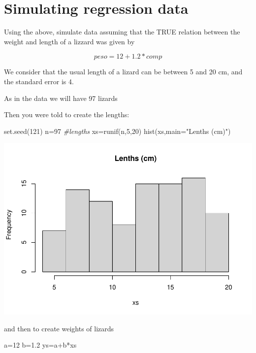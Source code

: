 \documentclass[
]{book}
\newenvironment{Shaded}{\begin{snugshade}}{\end{snugshade}}
\newcommand{\AttributeTok}[1]{\textcolor[rgb]{0.77,0.63,0.00}{#1}}
\newcommand{\CommentTok}[1]{\textcolor[rgb]{0.56,0.35,0.01}{\textit{#1}}}
\newcommand{\DecValTok}[1]{\textcolor[rgb]{0.00,0.00,0.81}{#1}}
\newcommand{\FloatTok}[1]{\textcolor[rgb]{0.00,0.00,0.81}{#1}}
\newcommand{\FunctionTok}[1]{\textcolor[rgb]{0.00,0.00,0.00}{#1}}
\newcommand{\NormalTok}[1]{#1}
\newcommand{\OtherTok}[1]{\textcolor[rgb]{0.56,0.35,0.01}{#1}}
\newcommand{\SpecialCharTok}[1]{\textcolor[rgb]{0.00,0.00,0.00}{#1}}
\newcommand{\StringTok}[1]{\textcolor[rgb]{0.31,0.60,0.02}{#1}}
\begin{document}
\hypertarget{simulating-regression-data}{%
\section{Simulating regression data}\label{simulating-regression-data}}

Using the above, simulate data assuming that the TRUE relation between the weight and length of a lizzard was given by

\[ peso = 12 + 1.2 * comp \]

We consider that the usual length of a lizard can be between 5 and 20 cm, and the standard error is 4.

As in the data we will have 97 lizards

Then you were told to create the lengths:

\begin{Shaded}
\begin{Highlighting}[]
\FunctionTok{set.seed}\NormalTok{(}\DecValTok{121}\NormalTok{)}
\NormalTok{n}\OtherTok{=}\DecValTok{97}
\CommentTok{\#lengths}
\NormalTok{xs}\OtherTok{=}\FunctionTok{runif}\NormalTok{(n,}\DecValTok{5}\NormalTok{,}\DecValTok{20}\NormalTok{)}
\FunctionTok{hist}\NormalTok{(xs,}\AttributeTok{main=}\StringTok{"Lenths (cm)"}\NormalTok{)}
\end{Highlighting}
\end{Shaded}

\includegraphics{ECOMODbook_files/figure-latex/a6.21-1.pdf}

and then to create weights of lizards

\begin{Shaded}
\begin{Highlighting}[]
\NormalTok{a}\OtherTok{=}\DecValTok{12}
\NormalTok{b}\OtherTok{=}\FloatTok{1.2}
\NormalTok{ys}\OtherTok{=}\NormalTok{a}\SpecialCharTok{+}\NormalTok{b}\SpecialCharTok{*}\NormalTok{xs}
\end{Highlighting}
\end{Shaded}
\end{document}
